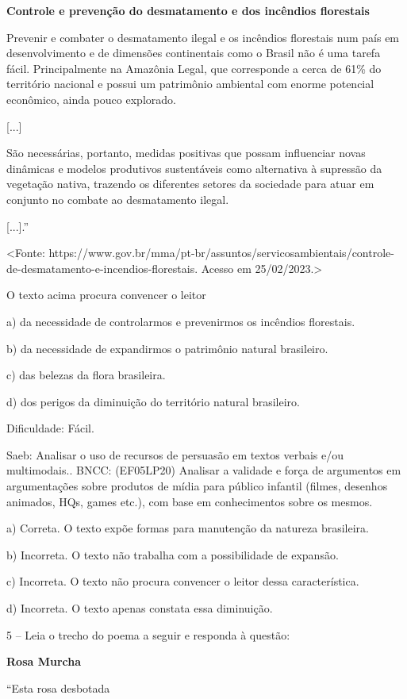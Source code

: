 \textbf{Controle e prevenção do desmatamento e dos incêndios florestais}

Prevenir e combater o desmatamento ilegal e os incêndios florestais num
país em desenvolvimento e de dimensões continentais como o Brasil não é
uma tarefa fácil. Principalmente na Amazônia Legal, que corresponde a
cerca de 61\% do território nacional e possui um patrimônio ambiental
com enorme potencial econômico, ainda pouco explorado.

{[}...{]}

São necessárias, portanto, medidas positivas que possam influenciar
novas dinâmicas e modelos produtivos sustentáveis como alternativa à
supressão da vegetação nativa, trazendo os diferentes setores da
sociedade para atuar em conjunto no combate ao desmatamento ilegal.

{[}...{]}.''

\textless{}Fonte:
https://www.gov.br/mma/pt-br/assuntos/servicosambientais/controle-de-desmatamento-e-incendios-florestais.
Acesso em 25/02/2023.\textgreater{}

O texto acima procura convencer o leitor

a) da necessidade de controlarmos e prevenirmos os incêndios florestais.

b) da necessidade de expandirmos o patrimônio natural brasileiro.

c) das belezas da flora brasileira.

d) dos perigos da diminuição do território natural brasileiro.

Dificuldade: Fácil.

Saeb: Analisar o uso de recursos de persuasão em textos verbais e/ou
multimodais.. BNCC: (EF05LP20) Analisar a validade e força de argumentos
em argumentações sobre produtos de mídia para público infantil (filmes,
desenhos animados, HQs, games etc.), com base em conhecimentos sobre os
mesmos.

a) Correta. O texto expõe formas para manutenção da natureza brasileira.

b) Incorreta. O texto não trabalha com a possibilidade de expansão.

c) Incorreta. O texto não procura convencer o leitor dessa
característica.

d) Incorreta. O texto apenas constata essa diminuição.

5 -- Leia o trecho do poema a seguir e responda à questão:

\textbf{Rosa Murcha}

``Esta rosa desbotada

